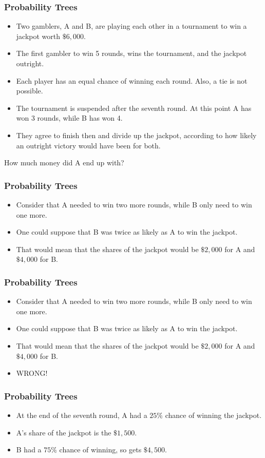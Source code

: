 \documentclass[slidemain.tex]{subfiles}
\begin{document}
 
	

\begin{frame}
\frametitle{Probability Trees}
{
\large
\vspace{-0.3cm}
\begin{itemize}
\item Two gamblers, A and B, are playing each other in a tournament to win a jackpot worth $\$6,000$. 
\item The first gambler to win 5 rounds, wins the tournament, and the jackpot outright.
\item Each player has an equal chance of winning each round. Also, a tie is not possible.
\item The tournament is suspended after the seventh round. At this point A has won 3 rounds, while B has won 4.
\item They agree to finish then and divide up the jackpot, according to how likely an outright victory would have been for both.
\end{itemize}
How much money did A end up with?
}
\end{frame}

\begin{frame}
\frametitle{Probability Trees}
{  \large 
\vspace{-0.4cm}
\begin{itemize}
\item Consider that A needed to win two more rounds, while B only need to win one more.
\item One could suppose that B was twice as likely as A to win the jackpot.
\item That would mean that the shares of the jackpot would be $\$2,000$ for A and 
$\$4,000$ for B.
\end{itemize}
}
\end{frame}
\begin{frame}
\frametitle{Probability Trees}
{  \large 
\vspace{-0.4cm}
\begin{itemize}
\item Consider that A needed to win two more rounds, while B only need to win one more.
\item One could suppose that B was twice as likely as A to win the jackpot.
\item That would mean that the shares of the jackpot would be $\$2,000$ for A and 
$\$4,000$ for B.
\item \alert{WRONG!}
\end{itemize}
}
\end{frame}
\begin{frame}
\frametitle{Probability Trees}
{  \large 
\vspace{-0.4cm}
\begin{itemize}
\item At the end of the seventh round, A had a $25\%$ chance of winning the jackpot.
\item A's share of the jackpot is  the $\$1,500$.
\item B had a $75\%$ chance of winning, so gets $\$4,500$.
\end{itemize}
}
\end{frame}
\end{document}
